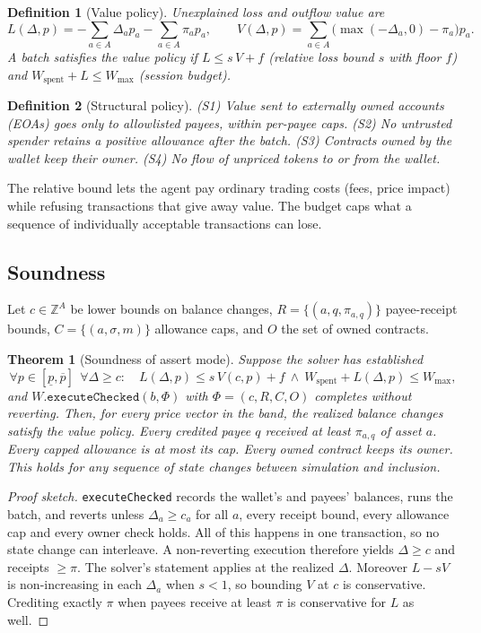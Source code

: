 \documentclass[11pt]{article}
\newtheorem{theorem}{Theorem}
\newtheorem{definition}{Definition}
\begin{document}
\begin{definition}[Value policy]
Unexplained loss and outflow value are
\[
L(\Delta,p)=-\sum_{a\in A}\Delta_a p_a-\sum_{a\in A}\pi_a p_a,\qquad
V(\Delta,p)=\sum_{a\in A}\big(\max(-\Delta_a,0)-\pi_a\big)p_a .
\]
A batch satisfies the value policy if $L\le s\,V+f$ (relative loss bound $s$ with floor $f$) and $W_{\text{spent}}+L\le W_{\max}$ (session budget).
\end{definition}

\begin{definition}[Structural policy]
(S1) Value sent to externally owned accounts (EOAs) goes only to allowlisted payees, within per-payee caps. (S2) No untrusted spender retains a positive allowance after the batch. (S3) Contracts owned by the wallet keep their owner. (S4) No flow of unpriced tokens to or from the wallet.
\end{definition}

The relative bound lets the agent pay ordinary trading costs (fees, price impact) while refusing transactions that give away value. The budget caps what a sequence of individually acceptable transactions can lose.

\subsection{Soundness}
Let $c\in\mathbb Z^{A}$ be lower bounds on balance changes, $R=\{(a,q,\pi_{a,q})\}$ payee-receipt bounds, $C=\{(a,\sigma,m)\}$ allowance caps, and $O$ the set of owned contracts.

\begin{theorem}[Soundness of assert mode]\label{thm:sound}
Suppose the solver has established
\[
\forall p\in[\underline p,\overline p]\ \ \forall \Delta\ge c:\quad L(\Delta,p)\le s\,V(c,p)+f\ \wedge\ W_{\text{spent}}+L(\Delta,p)\le W_{\max},
\]
and $W.\texttt{executeChecked}(b,\Phi)$ with $\Phi=(c,R,C,O)$ completes without reverting. Then, for every price vector in the band, the realized balance changes satisfy the value policy. Every credited payee $q$ received at least $\pi_{a,q}$ of asset $a$. Every capped allowance is at most its cap. Every owned contract keeps its owner. This holds for any sequence of state changes between simulation and inclusion.
\end{theorem}
\begin{proof}[Proof sketch]
\texttt{executeChecked} records the wallet's and payees' balances, runs the batch, and reverts unless $\Delta_a\ge c_a$ for all $a$, every receipt bound, every allowance cap and every owner check holds. All of this happens in one transaction, so no state change can interleave. A non-reverting execution therefore yields $\Delta\ge c$ and receipts $\ge\pi$. The solver's statement applies at the realized $\Delta$. Moreover $L-sV$ is non-increasing in each $\Delta_a$ when $s<1$, so bounding $V$ at $c$ is conservative. Crediting exactly $\pi$ when payees receive at least $\pi$ is conservative for $L$ as well.
\end{proof}
\end{document}
